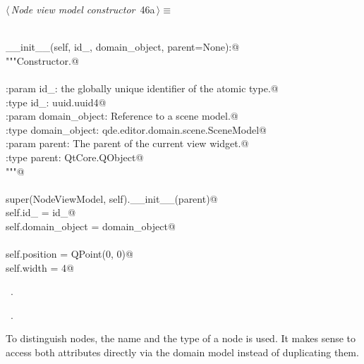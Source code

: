 \documentclass[
    a4paper,      %
    10pt,         %
    openright,    %
    notitlepage,  %
    parskip=half, %
]{scrreprt}       %
\theoremstyle{definition}                    %
\begin{document}
\begin{flushleft} \small
\begin{minipage}{\linewidth}\label{scrap60}\raggedright\small
{} $\langle\,${\itshape Node view model constructor}\nobreak\ {\footnotesize {46a}}$\,\rangle\equiv$
\vspace{-1exm}
\begin{list}{}{} \item
\mbox{}\lstinline@@\\
\mbox{}\lstinline@def __init__(self, id_, domain_object, parent=None):@\\
\mbox{}\lstinline@    """Constructor.@\\
\mbox{}\lstinline@@\\
\mbox{}\lstinline@    :param id_: the globally unique identifier of the atomic type.@\\
\mbox{}\lstinline@    :type  id_: uuid.uuid4@\\
\mbox{}\lstinline@    :param domain_object: Reference to a scene model.@\\
\mbox{}\lstinline@    :type  domain_object: qde.editor.domain.scene.SceneModel@\\
\mbox{}\lstinline@    :param parent: The parent of the current view widget.@\\
\mbox{}\lstinline@    :type parent:  QtCore.QObject@\\
\mbox{}\lstinline@    """@\\
\mbox{}\lstinline@@\\
\mbox{}\lstinline@    super(NodeViewModel, self).__init__(parent)@\\
\mbox{}\lstinline@    self.id_ = id_@\\
\mbox{}\lstinline@    self.domain_object = domain_object@\\
\mbox{}\lstinline@@\\
\mbox{}\lstinline@    self.position = QPoint(0, 0)@\\
\mbox{}\lstinline@    self.width = 4@\\
\mbox{}\lstinline@@{\NWsep}
\end{list}
\vspace{-1.5ex}
\footnotesize
\begin{list}{}{\setlength{\itemsep}{-\parsep}\setlength{\itemindent}{-\leftmargin}}
\item \NWtxtMacroDefBy\ .
\item \NWtxtMacroRefIn\ .

\item{}
\end{list}
\end{minipage}\vspace{4ex}
\end{flushleft}
To distinguish nodes, the name and the type of a node is used. It makes sense to
access both attributes directly via the domain model instead of duplicating them.
\end{document}
